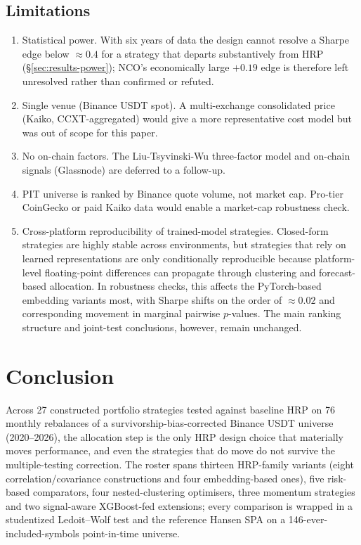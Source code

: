 \documentclass[11pt,a4paper]{article}
\begin{document}
\subsection{Limitations}
\begin{enumerate}
\item Statistical power. With six years of data the design cannot
    resolve a Sharpe edge below $\approx0.4$ for a strategy that
    departs substantively from HRP (\S\ref{sec:results-power}); NCO's
    economically large $+0.19$ edge is therefore left unresolved
    rather than confirmed or refuted.
\item Single venue (Binance USDT spot). A multi-exchange consolidated
    price (Kaiko, CCXT-aggregated) would give a more representative
    cost model but was out of scope for this paper.
\item No on-chain factors. The Liu-Tsyvinski-Wu \citep{liu2022cryptofactors}
    three-factor model and on-chain signals (Glassnode) are
    deferred to a follow-up.
\item PIT universe is ranked by Binance quote volume, not market cap.
    Pro-tier CoinGecko or paid Kaiko data would enable a market-cap
    robustness check.
\item Cross-platform reproducibility of trained-model strategies.
    Closed-form strategies are highly stable across environments, but
    strategies that rely on learned representations are only
    conditionally reproducible because platform-level floating-point
    differences can propagate through clustering and forecast-based
    allocation. In robustness checks, this affects the PyTorch-based
    embedding variants most, with Sharpe shifts on the order of
    $\approx 0.02$ and corresponding movement in marginal pairwise
    $p$-values. The main ranking structure and joint-test conclusions,
    however, remain unchanged.
\end{enumerate}

\section{Conclusion}
\label{sec:conclusion}

Across 27 constructed portfolio strategies tested against baseline HRP
on 76 monthly rebalances of a survivorship-bias-corrected Binance USDT
universe (2020--2026), the allocation step is the only HRP design
choice that materially moves performance, and even the strategies that
do move do not survive the multiple-testing correction. The roster
spans thirteen HRP-family variants (eight correlation/covariance
constructions and four embedding-based ones), five risk-based
comparators, four nested-clustering optimisers, three momentum
strategies and two signal-aware XGBoost-fed extensions; every
comparison is wrapped in a studentized Ledoit--Wolf test and the
reference Hansen SPA on a 146-ever-included-symbols point-in-time
universe.
\end{document}

